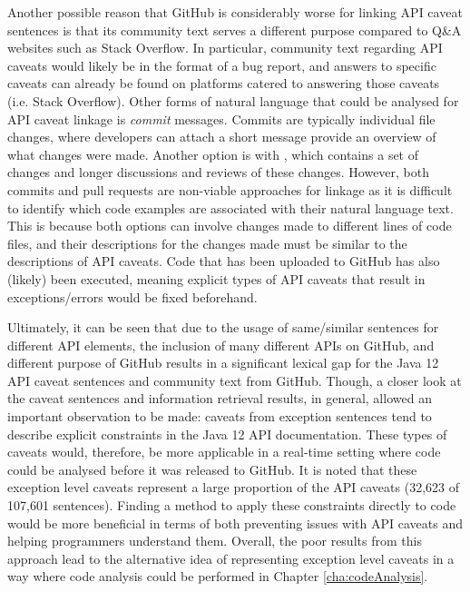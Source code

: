 Another possible reason that GitHub is considerably worse for linking API caveat sentences is that its community text serves a different purpose compared to Q\&A websites such as Stack Overflow. In particular, community text regarding API caveats would likely be in the format of a bug report, and answers to specific caveats can already be found on platforms catered to answering those caveats (i.e. Stack Overflow). Other forms of natural language that could be analysed for API caveat linkage is \textit{commit} messages. Commits are typically individual file changes, where developers can attach a short message provide an overview of what changes were made. Another option is with , which contains a set of changes and longer discussions and reviews of these changes. However, both commits and pull requests are non-viable approaches for linkage as it is difficult to identify which code examples are associated with their natural language text. This is because both options can involve changes made to different lines of code files, and their descriptions for the changes made must be similar to the descriptions of API caveats. Code that has been uploaded to GitHub has also (likely) been executed, meaning explicit types of API caveats that result in exceptions/errors would be fixed beforehand.\bigbreak

Ultimately, it can be seen that due to the usage of same/similar sentences for different API elements, the inclusion of many different APIs on GitHub, and different purpose of GitHub results in a significant lexical gap for the Java 12 API caveat sentences and community text from GitHub. Though, a closer look at the caveat sentences and information retrieval results, in general, allowed an important observation to be made: caveats from exception sentences tend to describe explicit constraints in the Java 12 API documentation. These types of caveats would, therefore, be more applicable in a real-time setting where code could be analysed before it was released to GitHub. It is noted that these exception level caveats represent a large proportion of the API caveats (32,623 of 107,601 sentences).   Finding a method to apply these constraints directly to code would be more beneficial in terms of both preventing issues with API caveats and helping programmers understand them. Overall, the poor results from this approach lead to the alternative idea of representing exception level caveats in a way where code analysis could be performed in Chapter \ref{cha:codeAnalysis}.

